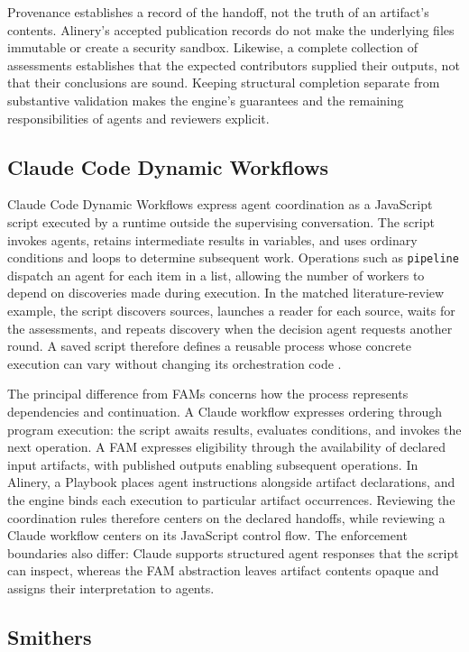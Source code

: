 \documentclass[letterpaper]{article}
\theoremstyle{definition}
\begin{document}
Provenance establishes a record of the handoff, not the truth of an artifact's
contents. Alinery's accepted publication records do not make the underlying
files immutable or create a security sandbox. Likewise, a complete collection
of assessments establishes that the expected contributors supplied their
outputs, not that their conclusions are sound. Keeping structural completion
separate from substantive validation makes the engine's guarantees and the
remaining responsibilities of agents and reviewers explicit.

\subsection{Claude Code Dynamic Workflows}

Claude Code Dynamic Workflows express agent coordination as a JavaScript
script executed by a runtime outside the supervising conversation. The script
invokes agents, retains intermediate results in variables, and uses ordinary
conditions and loops to determine subsequent work. Operations such as
\texttt{pipeline} dispatch an agent for each item in a list, allowing the number
of workers to depend on discoveries made during execution. In the matched
literature-review example, the script discovers sources, launches a reader for
each source, waits for the assessments, and repeats discovery when the decision
agent requests another round. A saved script therefore defines a reusable
process whose concrete execution can vary without changing its orchestration
code \cite{anthropic2026dynamicworkflows}.

The principal difference from FAMs concerns how the process represents
dependencies and continuation. A Claude workflow expresses ordering through
program execution: the script awaits results, evaluates conditions, and invokes
the next operation. A FAM expresses eligibility through the availability of
declared input artifacts, with published outputs enabling subsequent
operations. In Alinery, a Playbook places agent instructions alongside artifact
declarations, and the engine binds each execution to particular artifact
occurrences. Reviewing the coordination rules therefore centers on the
declared handoffs, while reviewing a Claude workflow centers on its JavaScript
control flow. The enforcement boundaries also differ: Claude supports
structured agent responses that the script can inspect, whereas the FAM
abstraction leaves artifact contents opaque and assigns their interpretation
to agents.

\subsection{Smithers}
\end{document}
